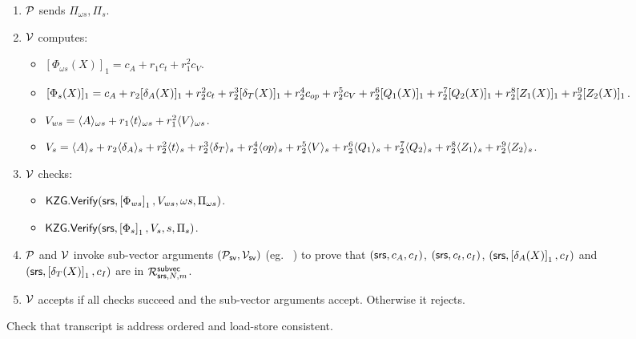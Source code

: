 \begin{figure}[htbp]
\begin{mdframed}
{\begin{enumerate}[leftmargin=1em, label=\arabic*]
\begin{itemize}
            \end{itemize}
            \item $\prover$ sends $\Pi_{\omega s}, \Pi_{s}$.
            \item $\verifier$ computes:
            \begin{itemize}
                \item $[\Phi_{\omega s}(X)]_1= c_A +r_1 c_t + r_1^2 c_V$.
                \item $[\Phi_{s}(X)]_1= c_A +r_2 [\delta_A(X)]_1 + r_2^2 c_t +r_2^3 [\delta_T(X)]_1 +r_2^4 c_{\op} +r_2^5 c_V +r_2^6 [Q_1(X)]_1 +r_2^7 [Q_2(X)]_1 +r_2^8 [Z_1(X)]_1 + r_2^9 [Z_2(X)]_1 $.
                \item $V_{ws}= \val{\omega s}{A}+r_1 \val{\omega s}{t}+ r_1^2 \val{\omega s}{V}$.
                \item $V_s=\val{s}{A}+r_2 \val{s}{\delta_A}+r_2^2 \val{s}{t}+r_2^3 \val{s}{\delta_T}+r_2^4 \val{s}{\op}
                +r_2^5 \val{s}{V} +r_2^6 \val{s}{Q_1} +r_2^7 \val{s}{Q_2}+r_2^8 \val{s}{Z_1} +r_2^9 \val{s}{Z_2}$.
            \end{itemize}
            \item $\verifier$ checks:
            \begin{itemize}
                \item $\KZGverify(\srs, \gone{\Phi_{ws}}, V_{ws}, \omega s, \Pi_{\omega s})$.
                \item $\KZGverify(\srs, \gone{\Phi_{s}}, V_{s}, s, \Pi_{s})$.
            \end{itemize}

            \item $\prover$ and $\verifier$ invoke sub-vector arguments $(\subvecprover,\subvecverifier)$ (eg. ~\cite{EPRINT:EagFioGab22})
            to prove that $(\srs,c_A,c_I)$, $(\srs,c_t,c_I)$, $(\srs,\gone{\delta_A(X)},c_I)$ and $(\srs,\gone{\delta_T(X)},c_I)$
            are in $\RSVEC$.

            \item $\verifier$ accepts if all checks succeed and the sub-vector arguments accept. Otherwise it rejects.
        \end{enumerate}
    }
    \end{mdframed}

    \caption{Check that transcript is address ordered and load-store consistent.}
    \label{fig:encoded-relations}
\end{figure}

